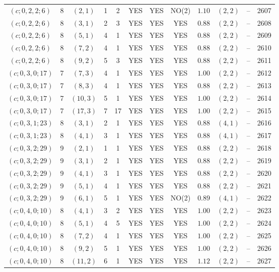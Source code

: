 \begin{longtable}{|c|c|c|c|c|c|c|c|c|c|c|c|}
$(c;0,2,2;6)$ & 8 & $(2,1)$ & 1 & 2 & YES & YES & NO(2) & $1.10$ & $(2,2)$ & -- & 2607\\
$(c;0,2,2;6)$ & 8 & $(3,1)$ & 2 & 3 & YES & YES & YES & $0.88$ & $(2,2)$ & -- & 2608\\
$(c;0,2,2;6)$ & 8 & $(5,1)$ & 4 & 1 & YES & YES & YES & $0.88$ & $(2,2)$ & -- & 2609\\
$(c;0,2,2;6)$ & 8 & $(7,2)$ & 4 & 1 & YES & YES & YES & $0.88$ & $(2,2)$ & -- & 2610\\
$(c;0,2,2;6)$ & 8 & $(9,2)$ & 5 & 3 & YES & YES & YES & $0.88$ & $(2,2)$ & -- & 2611\\
$(c;0,3,0;17)$ & 7 & $(7,3)$ & 4 & 1 & YES & YES & YES & $1.00$ & $(2,2)$ & -- & 2612\\
$(c;0,3,0;17)$ & 7 & $(8,3)$ & 4 & 1 & YES & YES & YES & $0.88$ & $(2,2)$ & -- & 2613\\
$(c;0,3,0;17)$ & 7 & $(10,3)$ & 5 & 1 & YES & YES & YES & $1.00$ & $(2,2)$ & -- & 2614\\
$(c;0,3,0;17)$ & 7 & $(17,3)$ & 7 & 17 & YES & YES & YES & $1.00$ & $(2,2)$ & -- & 2615\\
$(c;0,3,1;23)$ & 8 & $(3,1)$ & 2 & 1 & YES & YES & YES & $0.88$ & $(4,1)$ & -- & 2616\\
$(c;0,3,1;23)$ & 8 & $(4,1)$ & 3 & 1 & YES & YES & YES & $0.88$ & $(4,1)$ & -- & 2617\\
$(c;0,3,2;29)$ & 9 & $(2,1)$ & 1 & 1 & YES & YES & YES & $0.88$ & $(2,2)$ & -- & 2618\\
$(c;0,3,2;29)$ & 9 & $(3,1)$ & 2 & 1 & YES & YES & YES & $0.88$ & $(2,2)$ & -- & 2619\\
$(c;0,3,2;29)$ & 9 & $(4,1)$ & 3 & 1 & YES & YES & YES & $0.88$ & $(2,2)$ & -- & 2620\\
$(c;0,3,2;29)$ & 9 & $(5,1)$ & 4 & 1 & YES & YES & YES & $0.88$ & $(2,2)$ & -- & 2621\\
$(c;0,3,2;29)$ & 9 & $(6,1)$ & 5 & 1 & YES & YES & NO(2) & $0.89$ & $(4,1)$ & -- & 2622\\
$(c;0,4,0;10)$ & 8 & $(4,1)$ & 3 & 2 & YES & YES & YES & $1.00$ & $(2,2)$ & -- & 2623\\
$(c;0,4,0;10)$ & 8 & $(5,1)$ & 4 & 5 & YES & YES & YES & $1.00$ & $(2,2)$ & -- & 2624\\
$(c;0,4,0;10)$ & 8 & $(7,2)$ & 4 & 1 & YES & YES & YES & $1.00$ & $(2,2)$ & -- & 2625\\
$(c;0,4,0;10)$ & 8 & $(9,2)$ & 5 & 1 & YES & YES & YES & $1.00$ & $(2,2)$ & -- & 2626\\
$(c;0,4,0;10)$ & 8 & $(11,2)$ & 6 & 1 & YES & YES & YES & $1.12$ & $(2,2)$ & -- & 2627\\

\end{longtable}
